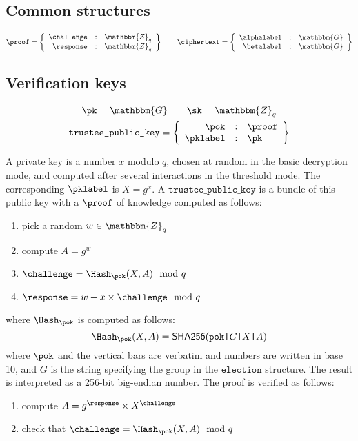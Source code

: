 \documentclass[a4paper]{article}
\newcommand{\G}{\mathbbm{G}}
\newcommand{\Z}{\mathbbm{Z}}
\newcommand{\shatwo}{\textsf{SHA256}}
\newcommand{\tpk}{\texttt{trustee\_public\_key}}
\newcommand{\election}{\texttt{election}}
\begin{document}
\subsection{Common structures}
\label{common}

\begin{gather*}
  \proof=\left\{
    \begin{array}{rcl}
      \challenge&:&\Z_q\\
      \response&:&\Z_q
    \end{array}
  \right\}
  \qquad
  \ciphertext=\left\{
    \begin{array}{rcl}
      \alphalabel&:&\G\\
      \betalabel&:&\G
    \end{array}
  \right\}
\end{gather*}

\subsection{Verification keys}
\label{trustee-keys}

\begin{gather*}
  \pk=\G\qquad\sk=\Z_q\\
  \tpk=\left\{
    \begin{array}{rcl}
      \pok&:&\proof\\
      \pklabel&:&\pk
    \end{array}
  \right\}
\end{gather*}

A private key is a number $x$ modulo $q$, chosen at random in the
basic decryption mode, and computed after several interactions in the
threshold mode.
The corresponding
$\pklabel$ is $X=g^x$. A $\tpk$ is a bundle of this public key with a
\hyperref[common]{$\proof$} of knowledge computed as follows:
\begin{enumerate}
\item pick a random $w\in\Z_q$
\item compute $A=g^w$
\item $\challenge=\Hash_\pok(X,A)\mod q$
\item $\response=w-x\times\challenge\mod q$
\end{enumerate}
where $\Hash_\pok$ is computed as follows:
\[\Hash_\pok(X,A) = \shatwo(\verb=pok|=G\verb=|=X\verb=|=A) \]
where $\pok$ and the vertical bars are verbatim and numbers are
written in base 10, and $G$ is the string specifying the group in the
$\election$ structure. The result is interpreted as a 256-bit
big-endian number. The proof is verified as follows:
\begin{enumerate}
\item compute $A={g^\response}\times{X^\challenge}$
\item check that $\challenge=\Hash_\pok(X,A)\mod q$
\end{enumerate}
\end{document}

